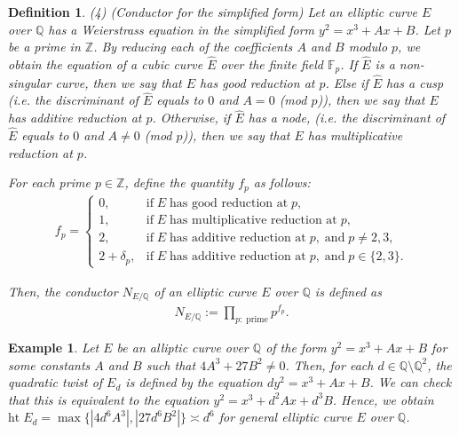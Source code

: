 \documentclass[12pt,reqno]{amsart}
\newtheorem{definition}[thm]{Definition}
\newtheorem{example}[thm]{Example}
\numberwithin{equation}{section}
\def\Z{{\mathbb Z}}
\def\Q{{\mathbb Q}}
\begin{document}
\begin{definition}
{\smallskip

(4) (Conductor for the simplified form) Let an elliptic curve $E$ over $\Q$ has a Weierstrass equation in the simplified form $y^2 = x^3 + Ax + B$. Let $p$ be a prime in $\Z$. By reducing each of the coefficients $A$ and $B$ modulo $p$, we obtain the equation of a cubic curve $\widehat{E}$ over the finite field $\mathbb{F}_p$. If $\widehat{E}$ is a non-singular curve, then we say that $E$ has good reduction at $p$. Else if $\widehat{E}$ has a cusp (i.e. the discriminant of $\widehat{E}$ equals to $0$ and $A = 0$ (mod $p$)), then we say that $E$ has additive reduction at $p$. Otherwise, if $\widehat{E}$ has a node,  (i.e. the discriminant of $\widehat{E}$ equals to $0$ and $A \neq 0$ (mod $p$)), then we say that $E$ has multiplicative reduction at $p$.

For each prime $p \in \Z$, define the quantity $f_p$ as follows:
\begin{align*}
f_p = \begin{cases}
0, & \mbox{if} \; E \; \text{has good reduction at} \; p, \\
1, & \mbox{if} \; E \; \text{has multiplicative reduction at} \; p, \\
2, & \mbox{if} \; E \; \text{has additive reduction at} \; p, \; \text{and} \; p \neq 2,3, \\
2+ \delta_p, & \mbox{if} \; E \; \text{has additive reduction at} \; p, \; \text{and} \; p \in \{2,3\}.
\end{cases}
\end{align*}

Then, the conductor $N_{E/\Q}$ of an elliptic curve $E$ over $\Q$ is defined as
\begin{align*}
N_{E/\Q} := \prod_{p: \; \text{prime}} p^{f_p}.
\end{align*}

}
\end{definition}

\begin{example}\label{htEd}
{\rm
 Let $E$ be an alliptic curve over $\Q$ of the form $y^2 = x^3 + Ax +B$ for some constants $A$ and $B$ such that $4A^3 + 27B^2 \neq 0$. Then, for each $d \in \Q \setminus \Q^2$, the quadratic twist of $E_d$ is defined by the equation $dy^2 = x^3 + Ax + B$. We can check that this is equivalent to the equation $y^2 = x^3 + d^2Ax + d^3B$. Hence, we obtain $\text{ht} \; E_d = \max \{ |4d^6A^3|, |27d^6B^2|\} \asymp d^6$ for general elliptic curve $E$ over $\Q$.
}
\end{example}
\vspace{2mm}
\end{document}
